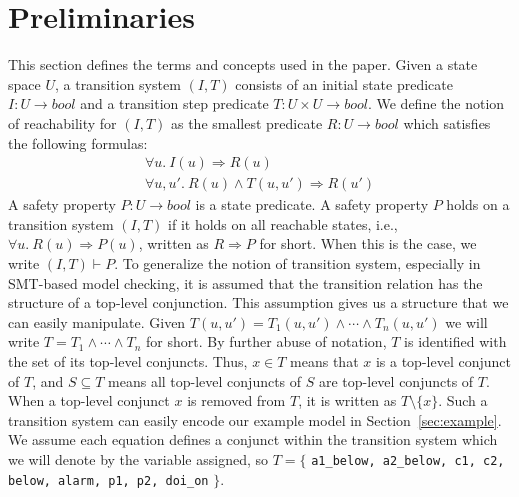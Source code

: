 \section{Preliminaries}
\label{sec:background}

\newcommand{\bool}[0]{\mathit{bool}}
\newcommand{\reach}[0]{\mathit{R}}
\newcommand{\ite}[3]{\mathit{if}\ {#1}\ \mathit{then}\ {#2}\ \mathit{else}\ {#3}}

This section defines the terms and concepts used in the paper. Given a state space $U$, a transition system $(I,T)$ consists of an
initial state predicate $I : U \to \bool$ and a transition step
predicate $T : U \times U \to \bool$. 
We define the notion of
reachability for $(I, T)$ as the smallest predicate $\reach : U \to
\bool$ which satisfies the following formulas:
\begin{gather*}
  \forall u.~ I(u) \Rightarrow \reach(u) \\
  \forall u, u'.~ \reach(u) \land T(u, u') \Rightarrow \reach(u')
\end{gather*}
A safety property $P : U \to \bool$ is a state predicate. A safety
property $P$ holds on a transition system $(I, T)$ if it holds on all
reachable states, i.e., $\forall u.~ \reach(u) \Rightarrow P(u)$,
written as $\reach \Rightarrow P$ for short. When this is the case, we
write $(I, T)\vdash P$. To generalize the notion of transition system, especially in SMT-based model checking, it is assumed that the transition relation has the structure of a top-level conjunction. This assumption gives us a structure that we can easily manipulate. Given $T(u, u') = T_1(u, u') \land \cdots \land T_n(u, u')$ we will write $T = T_1 \land \cdots \land T_n$ for short.
By further abuse of notation,
$T$ is identified with the set of its top-level conjuncts. Thus, $x \in
T$ means that $x$ is a top-level conjunct of $T$, and $S
\subseteq T$ means all top-level conjuncts of $S$ are top-level
conjuncts of $T$. When a top-level conjunct $x$ is removed from $T$, it is written as $T \setminus \{x\}$. Such a transition system can easily encode our example model in Section~\ref{sec:example}.  We assume each equation defines a conjunct within the transition system which we will denote by the variable assigned, so $T = \{$ {\small \texttt{a1\_below, a2\_below, c1, c2, below, alarm, p1, p2, doi\_on}} $\}$.

